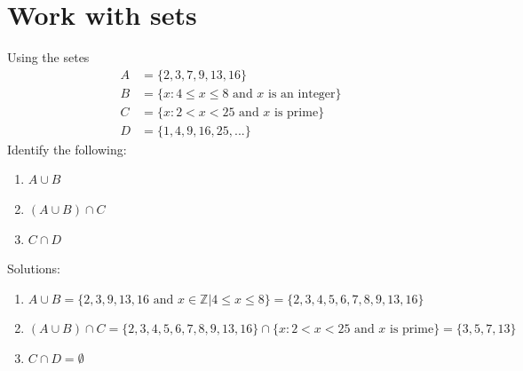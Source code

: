 \documentclass[12pt]{article}
\begin{document}
\section{Work with sets}
Using the setes
\begin{align*}
    A &= \{ 2,3,7,9,13,16\} 
    \\ B&= \{ x : 4\leq x \leq 8 \text{ and } x \text{ is an integer} \}
    \\ C &= \{ x : 2 < x < 25 \text{ and } x \text{ is prime}\}
    \\ D &= \{ 1,4,9,16,25,...\}
\end{align*}
Identify the following: 
\begin{enumerate}
    \item $ A \cup B$
    \item $(A \cup B) \cap C$
    \item $C \cap D$
\end{enumerate}
Solutions:
\begin{enumerate}
    \item $ A \cup B = \{ 2,3,9,13,16 \text{ and } x \in \mathbb{Z} | 4\leq x \leq 8 \} = \{ 2,3,4,5,6,7,8,9,13,16\}  $
    \item $(A \cup B) \cap C = \{ 2,3,4,5,6,7,8,9,13,16\} \cap  \{ x : 2 < x < 25 \text{ and } x \text{ is prime}\} = \{3,5,7,13\} $
    \item $C \cap D = \emptyset$
\end{enumerate}
\end{document}
